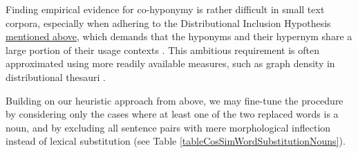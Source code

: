 \documentclass[oneside]{book}
\begin{document}
Finding empirical evidence for co-hyponymy is rather difficult in small text corpora, especially when adhering to the Distributional Inclusion Hypothesis \hyperref[distributionalInclusionHypothesis]{mentioned above}, which demands that the hyponyms and their hypernym share a large portion of their usage contexts \parencite[110]{geffetDistributionalInclusionHypotheses2005}. This ambitious requirement is often approximated using more readily available measures, such as graph density in distributional thesauri \parencites[2]{janaNetworkFeaturesBased2018}[4]{janaUsingDistributionalThesaurus2020}.

Building on our heuristic approach from above, we may fine-tune the procedure by considering only the cases where at least one of the two replaced words is a noun, and by excluding all sentence pairs with mere morphological inflection instead of lexical substitution (see Table \ref{tableCosSimWordSubstitutionNouns}). 
\end{document}
